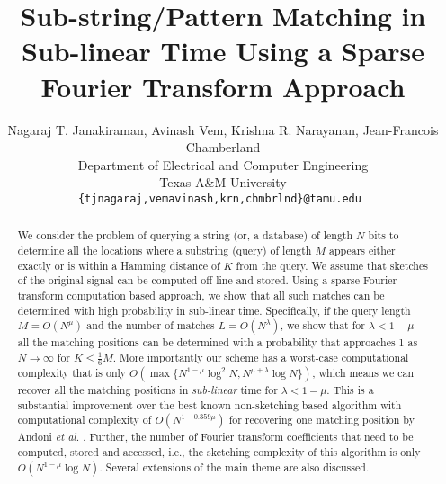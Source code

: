 \documentclass[sigconf]{acmart}
\begin{document}
\title[Sub-string Matching in Sub-linear Time]{Sub-string/Pattern Matching in Sub-linear Time Using a Sparse Fourier Transform Approach}

\author{Nagaraj T. Janakiraman, Avinash Vem, Krishna R. Narayanan, Jean-Francois Chamberland\\
Department of Electrical and Computer Engineering \\
Texas A\&M University\\
{\tt\small {\{tjnagaraj,vemavinash,krn,chmbrlnd\}@tamu.edu} }}

\renewcommand{\shortauthors}{Janakiraman et al.}

\begin{abstract}
	We consider the problem of querying a string (or, a database) of length $N$ bits to determine all the locations where a substring (query) of length $M$ appears either exactly or is within a Hamming distance of $K$ from the query. We assume that sketches of the original signal can be computed off line and stored. Using a sparse Fourier transform computation based approach, we show that all such matches can be determined with high probability in sub-linear time. Specifically, if the query length $M = O(N^\mu)$ and the number of matches $L=O(N^\lambda)$, we show that for $\lambda < 1-\mu$ all the matching positions can be determined with a probability that approaches 1 as $N \rightarrow \infty$ for $K \leq \frac{1}{6}M$. More importantly our scheme has a worst-case computational complexity that is only $O\left(\max\{N^{1-\mu}\log^2 N, N^{\mu+\lambda}\log N \}\right)$, which means we can recover all the matching positions in {\it sub-linear} time for $\lambda<1-\mu$. This is a substantial improvement over the best known non-sketching based algorithm with computational complexity of $O\left(N^{1-0.359 \mu} \right)$ for recovering one matching position by Andoni {\em et al.} \cite{andoni2013shift}. Further, the number of Fourier transform coefficients that need to be computed, stored and accessed, i.e., the sketching complexity of this algorithm is only $O\left(N^{1-\mu}\log N\right)$. Several extensions of the main theme are also discussed.
\end{abstract}
\end{document}
